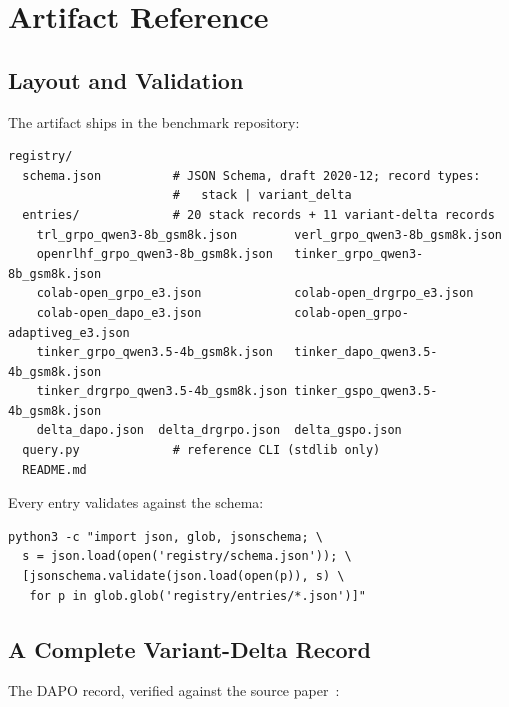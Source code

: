 \documentclass{article}
\begin{document}
\section{Artifact Reference}
\label{sec:p6-appendix}

\subsection{Layout and Validation}
\label{sec:p6-appendix-layout}
The artifact ships in the benchmark repository:

\begin{lstlisting}[basicstyle=\ttfamily\scriptsize, frame=single,
  caption={Artifact layout.}, label={lst:p6-layout}]
registry/
  schema.json          # JSON Schema, draft 2020-12; record types:
                       #   stack | variant_delta
  entries/             # 20 stack records + 11 variant-delta records
    trl_grpo_qwen3-8b_gsm8k.json        verl_grpo_qwen3-8b_gsm8k.json
    openrlhf_grpo_qwen3-8b_gsm8k.json   tinker_grpo_qwen3-8b_gsm8k.json
    colab-open_grpo_e3.json             colab-open_drgrpo_e3.json
    colab-open_dapo_e3.json             colab-open_grpo-adaptiveg_e3.json
    tinker_grpo_qwen3.5-4b_gsm8k.json   tinker_dapo_qwen3.5-4b_gsm8k.json
    tinker_drgrpo_qwen3.5-4b_gsm8k.json tinker_gspo_qwen3.5-4b_gsm8k.json
    delta_dapo.json  delta_drgrpo.json  delta_gspo.json
  query.py             # reference CLI (stdlib only)
  README.md
\end{lstlisting}

Every entry validates against the schema:

\begin{lstlisting}[basicstyle=\ttfamily\scriptsize, frame=single]
python3 -c "import json, glob, jsonschema; \
  s = json.load(open('registry/schema.json')); \
  [jsonschema.validate(json.load(open(p)), s) \
   for p in glob.glob('registry/entries/*.json')]"
\end{lstlisting}

\subsection{A Complete Variant-Delta Record}
\label{sec:p6-appendix-delta}
The DAPO record, verified against the source paper~\citep{yu2025dapo}:
\end{document}
